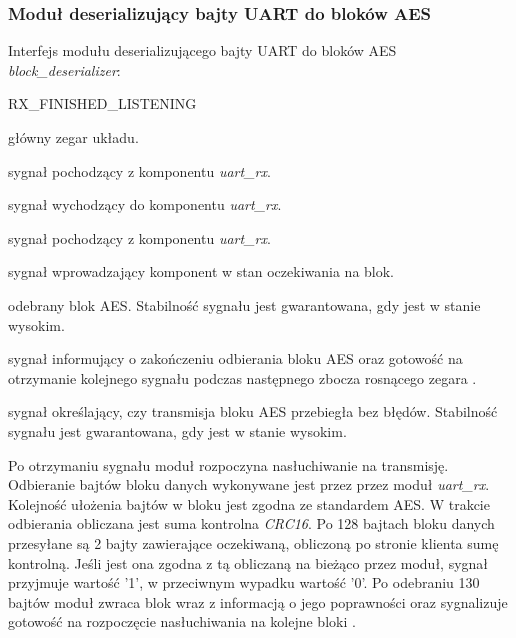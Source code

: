 \subsubsection{Moduł deserializujący bajty UART do bloków AES}
Interfejs modułu deserializującego bajty UART do bloków AES \textit{block\_deserializer}:
\begin{interface}{RX\_FINISHED\_LISTENING}
	\item[\insignal{CLK\_16}] główny zegar układu.

	\item[\insignal{RX\_BYTE[7:0]}] sygnał pochodzący z komponentu \textit{uart\_rx}.
	\item[\outsignal{RX\_START\_LISTENING}] sygnał wychodzący do komponentu \textit{uart\_rx}.
	\item[\insignal{RX\_FINISHED\_LISTENING}] sygnał pochodzący z komponentu \textit{uart\_rx}.

	\item[\insignal{START\_LISTENING}] sygnał wprowadzający komponent w stan oczekiwania na blok.
	\item[\outsignal{BLOCK[127:0]}] odebrany blok AES. Stabilność sygnału jest gwarantowana, gdy  jest w stanie wysokim.
	\item[\outsignal{FINISHED\_LISTENING}] sygnał informujący o zakończeniu odbierania bloku AES oraz gotowość na otrzymanie kolejnego sygnału  podczas następnego zbocza rosnącego zegara .
	\item[\outsignal{CORRECT}] sygnał określający, czy transmisja bloku AES przebiegła bez błędów. Stabilność sygnału jest gwarantowana, gdy  jest w stanie wysokim.
\end{interface}

Po otrzymaniu sygnału  moduł rozpoczyna nasłuchiwanie na transmisję. Odbieranie bajtów bloku danych wykonywane jest przez przez moduł \textit{uart\_rx}. Kolejność ułożenia bajtów w bloku  jest zgodna ze standardem AES. W trakcie odbierania obliczana jest suma kontrolna \textit{CRC16}. Po 128 bajtach bloku danych przesyłane są 2 bajty zawierające oczekiwaną, obliczoną po stronie klienta sumę kontrolną. Jeśli jest ona zgodna z tą obliczaną na bieżąco przez moduł, sygnał  przyjmuje wartość {'1'}, w przeciwnym wypadku wartość {'0'}. Po odebraniu 130 bajtów moduł zwraca blok  wraz z informacją o jego poprawności  oraz sygnalizuje gotowość na rozpoczęcie nasłuchiwania na kolejne bloki .

